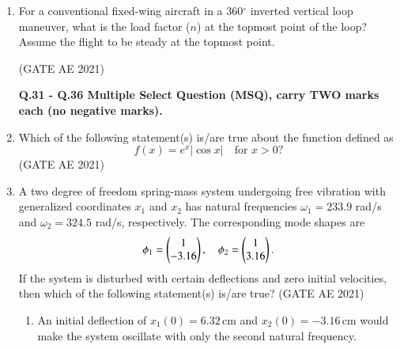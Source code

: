 \documentclass[journal,12pt,onecolumn]{IEEEtran}
\theoremstyle{remark}
\begin{document}
\begin{flushleft}
\begin{enumerate}
\item For a conventional fixed-wing aircraft in a 360$^{\circ}$ inverted vertical loop maneuver, what is the load factor ($n$) at the topmost point of the loop? Assume the flight to be steady at the topmost point.  

\hfill (GATE AE 2021)

\begin{enumerate}
\end{enumerate}



\textbf{ Q.31 - Q.36 Multiple Select Question (MSQ), carry TWO marks each (no negative marks).}

\item  
Which of the following statement(s) is/are true about the function defined as 
\[
f(x) = e^{x}|\cos x| \quad \text{for } x > 0 ?
\]
\hfill (GATE AE 2021)
\begin{enumerate}
\end{enumerate}



\item  
A two degree of freedom spring-mass system undergoing free vibration with generalized coordinates $x_1$ and $x_2$ has natural frequencies $\omega_1 = 233.9$ rad/s and $\omega_2 = 324.5$ rad/s, respectively. The corresponding mode shapes are 
\[
\phi_1 = \begin{pmatrix}1 \\ -3.16\end{pmatrix}, 
\quad 
\phi_2 = \begin{pmatrix}1 \\ 3.16\end{pmatrix}.
\] 
If the system is disturbed with certain deflections and zero initial velocities, then which of the following statement(s) is/are true?
\hfill (GATE AE 2021)
\begin{enumerate}
\item An initial deflection of $x_1(0) = 6.32 \, \text{cm}$ and $x_2(0) = -3.16 \, \text{cm}$ would make the system oscillate with only the second natural frequency.  


\end{enumerate}
\end{enumerate}
\end{flushleft}
\end{document}
